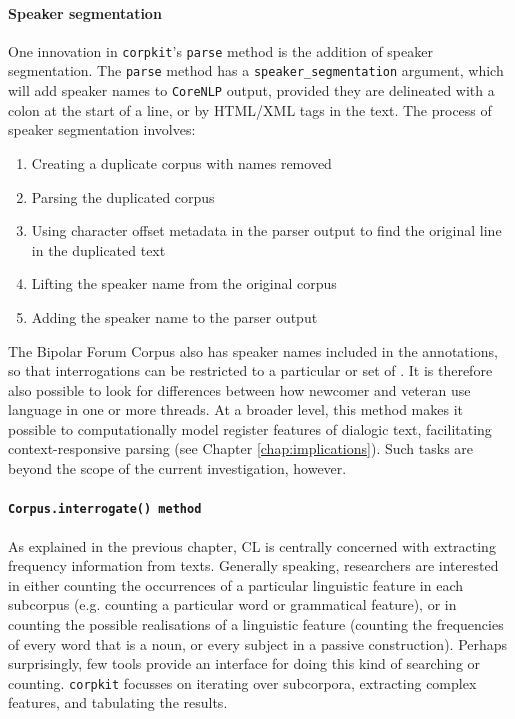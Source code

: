 \paragraph{Speaker segmentation}

One innovation in \texttt{corpkit}'s \texttt{parse} method is the addition of speaker segmentation. The \texttt{parse} method has a \texttt{speaker\_segmentation} argument, which will add speaker names to \texttt{CoreNLP} output, provided they are delineated with a colon at the start of a line, or by \gls{HTML}\slash \gls{XML} tags in the text. The process of speaker segmentation involves:

\begin{enumerate}
\item Creating a duplicate corpus with names removed
\item Parsing the duplicated corpus
\item Using character offset metadata in the parser output to find the original line in the duplicated text
\item Lifting the speaker name from the original corpus
\item Adding the speaker name to the parser output
\end{enumerate}
%
The Bipolar Forum Corpus also has speaker names included in the annotations, so that interrogations can be restricted to a particular  or set of . It is therefore also possible to look for differences between how newcomer and veteran  use language in one or more \glspl{thread}. At a broader level, this method makes it possible to computationally model register features of dialogic text, facilitating context\hyp{}responsive parsing (see Chapter \ref{chap:implications}). Such tasks are beyond the scope of the current investigation, however.

\paragraph{\texttt{Corpus.interrogate() method}}

As explained in the previous chapter, \gls{CL} is centrally concerned with extracting frequency information from texts. Generally speaking, researchers are interested in either counting the occurrences of a particular linguistic feature in each subcorpus (e.g. counting a particular word or grammatical feature), or in counting the possible realisations of a linguistic feature (counting the frequencies of every word that is a noun, or every subject in a passive construction). Perhaps surprisingly, few tools provide an interface for doing this kind of searching or counting. \texttt{corpkit} focusses on iterating over subcorpora, extracting complex  features, and tabulating the results.

